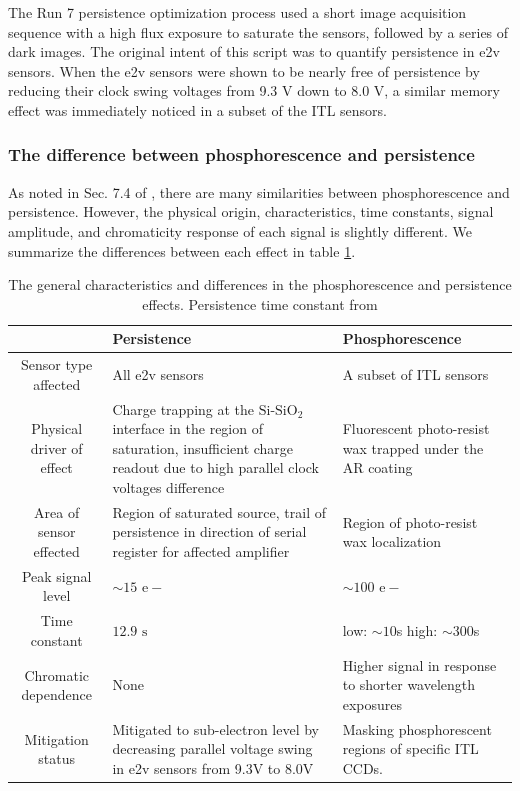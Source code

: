 The Run 7 persistence optimization process used a short image acquisition sequence with a high flux exposure to saturate the sensors, followed by a series of dark images. The original intent of this script was to quantify persistence in e2v sensors. When the e2v sensors were shown to be nearly free of persistence by reducing their clock swing voltages from 9.3 V down to 8.0 V, a similar memory effect was immediately noticed in a subset of the ITL sensors.

\subsubsection{The difference between phosphorescence and persistence}

As noted in Sec. 7.4 of \cite{SITCOMTN-148}, there are many similarities between phosphorescence and persistence. However, the physical origin, characteristics, time constants, signal amplitude, and chromaticity response of each signal is slightly different. We summarize the differences between each effect in table \ref{tab:phosphorescence_persistence_characteristics}.

\begin{table}[]
\centering
\begin{tabular}{|c|p{6cm}|p{6cm}|}
\hline
                          & Persistence & Phosphorescence \\ \hline\hline
Sensor type affected      & All e2v sensors            & A subset of ITL sensors                \\ \hline
Physical driver of effect & Charge trapping at the $\text{Si-SiO}_2$ interface in the region of saturation, insufficient charge readout due to high parallel clock voltages difference & Fluorescent photo-resist wax trapped under the AR coating  \\ \hline
Area of sensor effected   & Region of saturated source, trail of persistence in direction of serial register for affected amplifier & Region of photo-resist wax localization                 \\ \hline
Peak signal level         & $\sim15 \text{ e}-$ &  $\sim100 \text{ e}-$ \\ \hline
Time constant            & $12.9\text{ s}$             & low: $\sim10$s high: $\sim300$s                \\ \hline
Chromatic dependence            & None & Higher signal in response to shorter wavelength exposures \\ \hline
Mitigation status         &   Mitigated to sub-electron level by decreasing parallel voltage swing in e2v sensors from 9.3V to 8.0V & Masking phosphorescent regions of specific ITL CCDs. \\ \hline\hline
\end{tabular}
\caption{The general characteristics and differences in the phosphorescence and persistence effects. Persistence time constant from \cite{DMTN-276}}
\label{tab:phosphorescence_persistence_characteristics}
\end{table}


